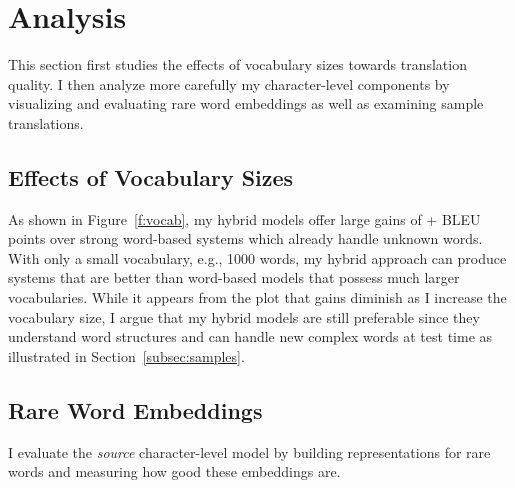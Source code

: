 \section{Analysis}
\label{sec:analysis}
This section first studies the effects of vocabulary sizes towards
translation quality. I then analyze more carefully 
my character-level components by visualizing and evaluating rare word
embeddings as well as examining sample translations.

\subsection{Effects of Vocabulary Sizes}
As shown in Figure~\ref{f:vocab}, my hybrid models offer large gains of
+\gain{} BLEU points over strong word-based systems which already handle unknown words.
With only a small vocabulary, e.g., 1000 words, my hybrid approach can produce
systems that are better than word-based models that possess much larger
vocabularies. While it appears from the plot that gains diminish as I
increase the vocabulary size, I argue that my hybrid models are still
preferable since they understand word structures and can handle new complex
words at test time as illustrated in Section~\ref{subsec:samples}.


\subsection{Rare Word Embeddings}
I evaluate the {\it source} character-level model by building representations
for rare words and measuring how good these embeddings are.

